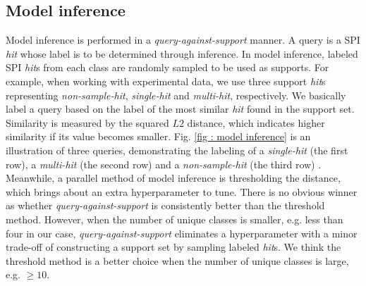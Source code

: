 \subsection{Model inference}

Model inference is performed in a \textit{query-against-support} manner.  A
query is a SPI \textit{hit} whose label is to be determined through inference.
In model inference, labeled SPI \textit{hit}s from each class are randomly
sampled to be used as supports.  For example, when working with experimental
data, we use three support \textit{hit}s representing \textit{non-sample-hit},
\textit{single-hit} and \textit{multi-hit}, respectively.  We basically label a
query based on the label of the most similar \textit{hit} found in the support
set.  Similarity is measured by the squared $L2$ distance, which indicates
higher similarity if its value becomes smaller.  Fig.  \ref{fig : model
inference} is an illustration of three queries, demonstrating the labeling of a
\textit{single-hit} (the first row), a \textit{multi-hit} (the second row) and a
\textit{non-sample-hit} (the third row) .  Meanwhile, a parallel method of model
inference is thresholding the distance, which brings about an extra
hyperparameter to tune.  There is no obvious winner as whether
\textit{query-against-support} is consistently better than the threshold method.
However, when the number of unique classes is smaller, e.g.  less than four in
our case, \textit{query-against-support} eliminates a hyperparameter with a
minor trade-off of constructing a support set by sampling labeled \textit{hit}s.
We think the threshold method is a better choice when the number of unique
classes is large, e.g. $\ge 10$.  

